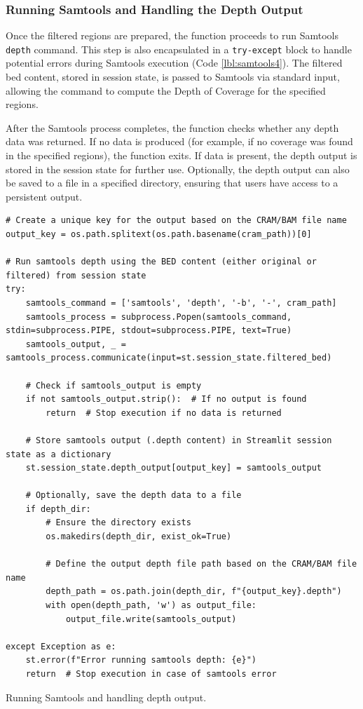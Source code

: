 \subsubsection{\textbf{Running Samtools and Handling the Depth Output}}

Once the filtered regions are prepared, the function proceeds to run Samtools \texttt{depth} command. This step is also encapsulated in a \texttt{try-except} block to handle potential errors during Samtools execution (Code \ref{lbl:samtools4}). The filtered \ac{bed} content, stored in session state, is passed to Samtools via standard input, allowing the command to compute the Depth of Coverage for the specified regions.

After the Samtools process completes, the function checks whether any depth data was returned. If no data is produced (for example, if no coverage was found in the specified regions), the function exits. If data is present, the depth output is stored in the session state for further use. Optionally, the depth output can also be saved to a file in a specified directory, ensuring that users have access to a persistent output.

\begin{longlisting}
\begin{verbatim}
# Create a unique key for the output based on the CRAM/BAM file name
output_key = os.path.splitext(os.path.basename(cram_path))[0]

# Run samtools depth using the BED content (either original or filtered) from session state
try:
    samtools_command = ['samtools', 'depth', '-b', '-', cram_path]
    samtools_process = subprocess.Popen(samtools_command, stdin=subprocess.PIPE, stdout=subprocess.PIPE, text=True)
    samtools_output, _ = samtools_process.communicate(input=st.session_state.filtered_bed)

    # Check if samtools_output is empty
    if not samtools_output.strip():  # If no output is found
        return  # Stop execution if no data is returned

    # Store samtools output (.depth content) in Streamlit session state as a dictionary
    st.session_state.depth_output[output_key] = samtools_output

    # Optionally, save the depth data to a file
    if depth_dir:
        # Ensure the directory exists
        os.makedirs(depth_dir, exist_ok=True)

        # Define the output depth file path based on the CRAM/BAM file name
        depth_path = os.path.join(depth_dir, f"{output_key}.depth")
        with open(depth_path, 'w') as output_file:
            output_file.write(samtools_output)

except Exception as e:
    st.error(f"Error running samtools depth: {e}")
    return  # Stop execution in case of samtools error
\end{verbatim}
\caption{Running Samtools and handling depth output.}
\label{lbl:samtools4}
\end{longlisting}

